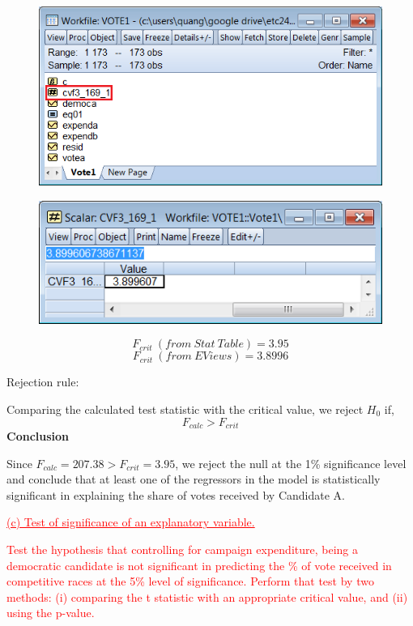 \documentclass[12pt]{report}
\begin{document}
\vspace{-\baselineskip}
\begin{figure}[H]
	\centering
	\includegraphics{q1_7}
\end{figure}
\vspace{-\baselineskip}
\begin{figure}[H]
	\centering
	\includegraphics{q1_8}
\end{figure}
\vspace{-\baselineskip}
$$F_{crit}\ (from\ Stat\ Table) = 3.95$$
$$F_{crit}\ (from\ EViews) = 3.8996$$

\noindent Rejection rule: 

\noindent Comparing the calculated test statistic with the critical value, we reject $H_0$ if,
$$F_{calc} > F_{crit}$$
\noindent \textbf{Conclusion}

\noindent Since $F_{calc}=207.38>F_{crit}=3.95$, we reject the null at the 1\% significance level and conclude that at least one of the regressors in the model is statistically significant in explaining the share of votes received by Candidate A.

\newpage
\noindent \textcolor{red}
{
	\uline{(c) Test of significance of an explanatory variable.}
}

\noindent \textcolor{red}
{
	Test the hypothesis that controlling for campaign expenditure, being a democratic candidate is not significant in predicting the \% of vote received in competitive races at the 5\% level of significance. Perform that test by two methods: 
	(i) comparing the t statistic with an appropriate critical value, and 
	(ii) using the p-value.
}
\end{document}
